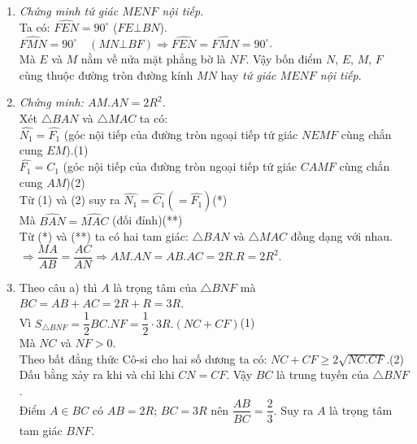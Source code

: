 \begin{ex}
{\begin{enumerate}
         $BC\bot NF$ (gt) nên $BC$ là đường cao, mà $BC$ cắt $MN$ tại $A$ nên $A$ là trực tâm. $FA$ thuộc đường cao thứ ba nên $FA\bot BN$ mà $\widehat{BEA}=90^{\circ}$ (góc nội tiếp chắn nửa đường tròn) $\Rightarrow EA\bot BN$, theo tiên đề Euclide (Ơ-cờ-lít) thì qua $A$ kẻ được duy nhất một đường thẳng vuông góc với $BN$ nên ba điểm $A$, $E$, $F$ thẳng hàng.
         \item[] \textit{Chứng minh tứ giác $MENF$ nội tiếp}.\\
         Ta có: $\widehat{FEN}=90^{\circ}$ ($FE\bot BN$).\\
         $\widehat{FMN}=90^{\circ}\quad(MN\bot BF)\Rightarrow \widehat{FEN}=\widehat{FMN}=90^{\circ}$.\\
         Mà $E$ và $M$ nằm về nửa mặt phẳng bờ là $NF$. Vậy bốn điểm $N$, $E$, $M$, $F$ cùng thuộc đường tròn đường kính $MN$ hay \textit{tứ giác $MENF$ nội tiếp}.
         \item \textit{Chứng minh: $AM.AN=2R^2$}.\\
         Xét $\triangle BAN$ và $\triangle MAC$ ta có:\\
         $\widehat{N_1}=\widehat{F_1}$ (góc nội tiếp của đường tròn ngoại tiếp tứ giác $NEMF$ cùng chắn cung $EM$).\quad (1)\\
         $\widehat{F_1}=\widehat{C_1}$ (góc nội tiếp của đường tròn ngoại tiếp tứ giác $CAMF$ cùng chắn cung $AM$)\quad(2)\\
         Từ (1) và (2) suy ra $\widehat{N_1}=\widehat{C_1}(=\widehat{F_1})$\quad(*)\\
         Mà $\widehat{BAN}=\widehat{MAC}$ (đối đỉnh)\quad(**)\\
         Từ (*) và (**) ta có hai tam giác: $\triangle BAN$ và $\triangle MAC$ đồng dạng với nhau.\\
         $\Rightarrow \dfrac{MA}{AB}=\dfrac{AC}{AN}\Rightarrow AM.AN=AB.AC=2R.R=2R^2$.
         \item Theo câu a) thì $A$ là trọng tâm của $\triangle BNF$ mà $BC=AB+AC=2R+R=3R$.\\
         Vì $S_{\triangle BNF}=\dfrac{1}{2}BC.NF=\dfrac{1}{2}\cdot 3R.(NC+CF)$\quad(1)\\
         Mà $NC$ và $NF>0$.\\
         Theo bất đẳng thức Cô-si cho hai số dương ta có: $NC+CF\geq 2\sqrt{NC.CF}$.\quad(2)\\
         Dấu bằng xảy ra khi và chỉ khi $CN=CF$. Vậy $BC$ là trung tuyến của $\triangle BNF$.\\
         Điểm $A\in BC$ có $AB=2R$; $BC=3R$ nên $\dfrac{AB}{BC}=\dfrac{2}{3}$. Suy ra $A$ là trọng tâm tam giác $BNF$.\\

\end{enumerate}}
\end{ex}
